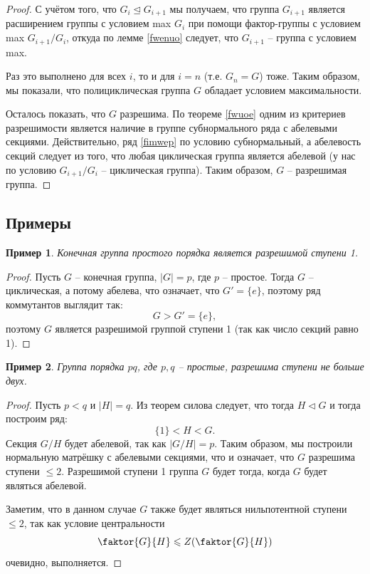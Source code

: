 \documentclass{article}
\newtheorem{example}{Пример}[section]
\begin{document}
\begin{proof}
    С учётом того, что $G_i \trianglelefteq G_{i + 1}$ мы получаем, что группа $G_{i + 1}$ является расширением группы с условием max $G_i$ при помощи фактор-группы с условием max $G_{i + 1} / G_i$, откуда по лемме \ref{fwenuo} следует, что $G_{i + 1}$ -- группа с условием max.

    Раз это выполнено для всех $i$, то и для $i = n$ (т.е. $G_n = G$) тоже. Таким образом, мы показали, что полициклическая группа $G$ обладает условием максимальности.

    Осталось показать, что $G$ разрешима. По теореме \ref{fwuoe} одним из критериев разрешимости является наличие в группе субнормального ряда с абелевыми секциями. Действительно, ряд \eqref{fimwep} по условию субнормальный, а абелевость секций следует из того, что любая циклическая группа является абелевой (у нас по условию $G_{i + 1} / G_i$ -- циклическая группа). Таким образом, $G$ -- разрешимая группа.
\end{proof}

\newpage

\subsection{Примеры}

\begin{example}
    Конечная группа простого порядка является разрешимой ступени 1.
\end{example}
\begin{proof}
    Пусть $G$ -- конечная группа, $|G| = p$, где $p$ -- простое. Тогда $G$ -- циклическая, а потому абелева, что означает, что $G' = \{ e \}$, поэтому ряд коммутантов выглядит так: $$ G > G' = \{ e \}, $$ поэтому $G$ является разрешимой группой ступени 1 (так как число секций равно 1).
\end{proof}

\begin{example}
    Группа порядка $pq$, где $p,q$ -- простые, разрешима ступени не больше двух.
\end{example}
\begin{proof}
    Пусть $p < q$ и $|H| = q$. Из теорем силова следует, что тогда $H \triangleleft G$ и тогда построим ряд:
    \[
        \{ 1 \} < H < G.
    \]
    Секция $G / H$ будет абелевой, так как $|G / H| = p$. Таким образом, мы построили нормальную матрёшку с абелевыми секциями, что и означает, что $G$ разрешима ступени $\leqslant 2$. Разрешимой ступени 1 группа $G$ будет тогда, когда $G$ будет являться абелевой.

    Заметим, что в данном случае $G$ также будет являться нильпотентной ступени $\leqslant 2$, так как условие центральности
    \[
        \faktor{G}{H} \leqslant Z(\faktor{G}{H})
    \]
    очевидно, выполняется.
\end{proof}
\end{document}
